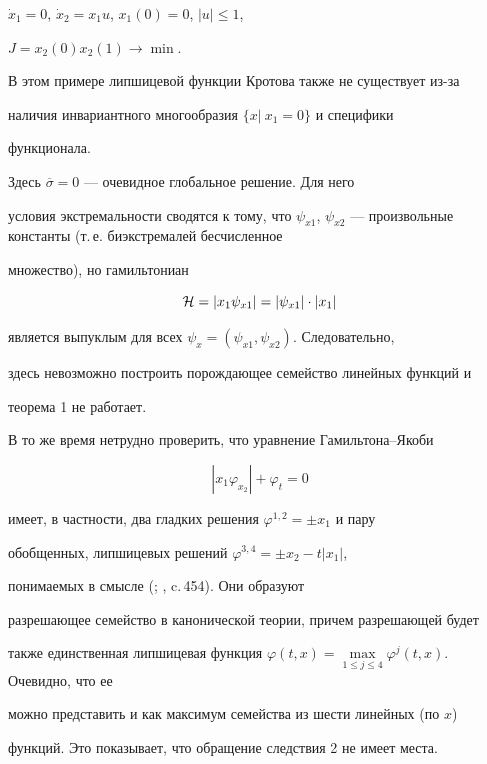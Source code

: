 \begin{exam}


$\Dot{x}_1=0$, $\Dot{x}_2=x_1u$, $x_1 (0)=0$, $|u|\leq 1$,


$J=x_2(0)x_2(1)\rightarrow\min$.





В этом примере липшицевой функции Кротова также не существует из-за


наличия инвариантного многообразия $\{x|~x_1=0\}$ и специфики


функционала.


Здесь $\overline{\sigma}=0$ --- очевидное глобальное решение. Для него


условия экстремальности сводятся к тому, что $\psi_{x1}$, $\psi


_{x2}$ --- произвольные константы (т.\,е. биэкстремалей бесчисленное


множество), но гамильтониан


$$


{\cal H}=|x_1\psi_{x1} |=|\psi_{x1} |\cdot |x_1 |


$$


является выпуклым для всех $\psi_x =(\psi_{x1}, \psi_{x2})$. Следовательно,


здесь невозможно построить порождающее семейство линейных функций и


теорема 1 не работает.





В то же время нетрудно проверить, что уравнение Гамильтона--Якоби


$$


|x_1 \varphi_{x_2}| +\varphi_t =0


$$


имеет, в частности, два гладких решения $\varphi^{1,2} =\pm x_1$ и пару


обобщенных, липшицевых решений $\varphi^{3,4}=\pm x_2-t|x_1 |$,


понимаемых в смысле (\cite{19}; \cite{20}, c.\,454). Они образуют


разрешающее семейство в канонической теории, причем разрешающей будет


также единственная липшицевая функция $\varphi


(t,x)=\max\limits_{1\leq j\leq 4}\varphi^j (t,x)$. Очевидно, что ее


можно представить и как максимум семейства из шести линейных (по $x$)


функций. Это показывает, что обращение следствия 2 не имеет места.


\end{exam}








